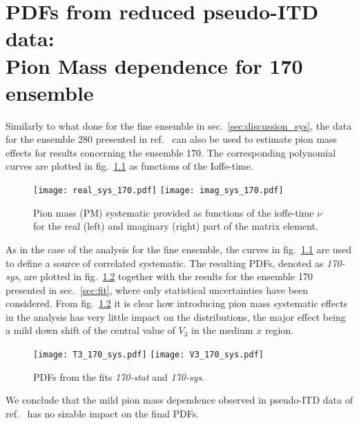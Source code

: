\chapter{PDFs from reduced pseudo-ITD data:  \\ Pion Mass dependence for 170 ensemble}
Similarly to what done for the fine ensemble in sec.~\ref{sec:discussion_sys},
the data for the ensemble 280 presented in ref.~\cite{Joo:2020spy} can also be used to estimate pion mass effects
for results concerning the ensemble 170. The corresponding polynomial curves are plotted in fig.~\ref{fig:sys_170}
as functions of the Ioffe-time.
\begin{figure}[h!]
    \centering
    \texttt{[image: real\_sys\_170.pdf]}  
    \texttt{[image: imag\_sys\_170.pdf]}
\caption{Pion mass (PM) systematic provided 
as functions of the ioffe-time $\nu$ for the real (left) and imaginary (right) part 
of the matrix element.}
\label{fig:sys_170}
\end{figure}

%
As in the case of the analysis for the fine ensemble, the curves in fig.~\ref{fig:sys_170} are used 
to define a source of correlated systematic. The resulting PDFs, denoted as \textit{170-sys}, are 
plotted in fig.~\ref{fig:res_170_sys} together with the results for the ensemble 170 presented in sec.~\ref{sec:fit},
where only statistical uncertainties have been considered.
From fig.~\ref{fig:res_170_sys} it is clear how introducing pion mass systematic effects in the analysis has very little impact on
the distributions, the major effect being a mild down shift of the central value of $V_3$ in the medium $x$ region.
\begin{figure}[h!]
    \centering
    \texttt{[image: T3\_170\_sys.pdf]}  
    \texttt{[image: V3\_170\_sys.pdf]}
\caption{PDFs from the fits \textit{170-stat} and \textit{170-sys}.}
\label{fig:res_170_sys}
\end{figure}
We conclude that the mild pion mass dependence observed in pseudo-ITD data of ref.~\cite{Joo:2020spy} has no sizable impact
on the final PDFs.
